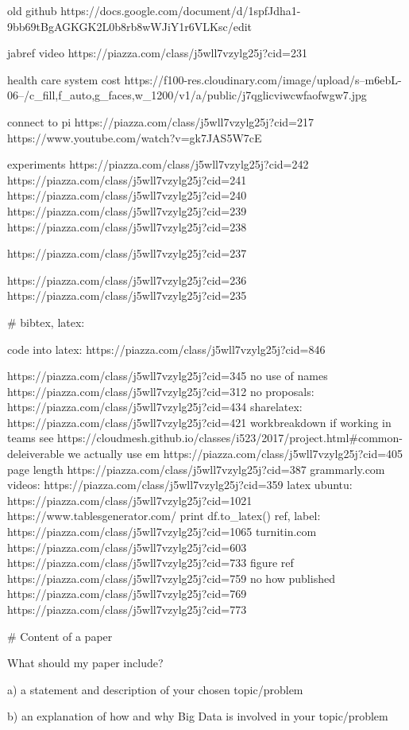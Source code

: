 old github
https://docs.google.com/document/d/1spfJdha1-9bb69tBgAGKGK2L0b8rb8wWJiY1r6VLKsc/edit

jabref video
https://piazza.com/class/j5wll7vzylg25j?cid=231

health care system cost
https://f100-res.cloudinary.com/image/upload/s--m6ebL-06--/c_fill,f_auto,g_faces,w_1200/v1/a/public/j7qglicviwcwfaofwgw7.jpg

connect to pi
https://piazza.com/class/j5wll7vzylg25j?cid=217
https://www.youtube.com/watch?v=gk7JAS5W7cE


experiments
https://piazza.com/class/j5wll7vzylg25j?cid=242
https://piazza.com/class/j5wll7vzylg25j?cid=241
https://piazza.com/class/j5wll7vzylg25j?cid=240
https://piazza.com/class/j5wll7vzylg25j?cid=239
https://piazza.com/class/j5wll7vzylg25j?cid=238

https://piazza.com/class/j5wll7vzylg25j?cid=237

https://piazza.com/class/j5wll7vzylg25j?cid=236
https://piazza.com/class/j5wll7vzylg25j?cid=235


# bibtex, latex:

code into latex: https://piazza.com/class/j5wll7vzylg25j?cid=846

https://piazza.com/class/j5wll7vzylg25j?cid=345
no use of names https://piazza.com/class/j5wll7vzylg25j?cid=312
no proposals: https://piazza.com/class/j5wll7vzylg25j?cid=434
sharelatex: https://piazza.com/class/j5wll7vzylg25j?cid=421
workbreakdown if working in teams
see https://cloudmesh.github.io/classes/i523/2017/project.html#common-deleiverable
we actually use em https://piazza.com/class/j5wll7vzylg25j?cid=405
page length https://piazza.com/class/j5wll7vzylg25j?cid=387
grammarly.com
videos: https://piazza.com/class/j5wll7vzylg25j?cid=359
latex ubuntu: https://piazza.com/class/j5wll7vzylg25j?cid=1021
https://www.tablesgenerator.com/
 print df.to_latex()
ref, label: https://piazza.com/class/j5wll7vzylg25j?cid=1065
turnitin.com
https://piazza.com/class/j5wll7vzylg25j?cid=603
https://piazza.com/class/j5wll7vzylg25j?cid=733
figure ref https://piazza.com/class/j5wll7vzylg25j?cid=759
no how published https://piazza.com/class/j5wll7vzylg25j?cid=769
https://piazza.com/class/j5wll7vzylg25j?cid=773


# Content of a paper

What should my paper include?

a) a statement and description of your chosen topic/problem

b) an explanation of how and why Big Data is involved in your
topic/problem

